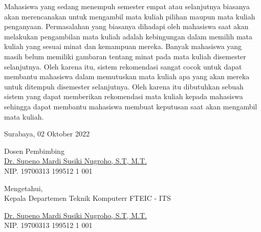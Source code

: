 Mahasiswa yang sedang menempuh semester empat atau selanjutnya biasanya akan merencanakan
untuk mengambil mata kuliah pilihan maupun mata kuliah penganyaan. Permasalahan yang biasanya dihadapi oleh mahasiswa
saat akan melakukan pengambilan mata kuliah adalah kebingungan dalam memilih mata kuliah
yang sesuai minat dan kemampuan mereka. Banyak mahasiswa yang masih belum memiliki gambaran
tentang minat pada mata kuliah disemester selanjutnya. Oleh karena itu, sistem rekomendasi
sangat cocok untuk dapat membantu mahasiswa dalam memutuskan mata kuliah apa yang akan mereka
untuk ditempuh disemester selanjutnya. Oleh karena itu dibutuhkan sebuah sistem yang dapat memberikan
rekomendasi mata kuliah kepada mahasiswa sehingga dapat membantu mahasiswa membuat keputusan saat akan
mengambil mata kuliah.
\vspace{1ex}

\begin{flushright}
  Surabaya, 02 Oktober 2022
\end{flushright}
\vspace{1ex}

\begin{center}







  Dosen Pembimbing \\
  \vspace{12ex}
  \underline{Dr. Supeno Mardi Susiki Nugroho, S.T, M.T.} \\
  NIP. 19700313 199512 1 001

  \vspace{6ex}

  Mengetahui, \\
  Kepala Departemen Teknik Komputerr FTEIC - ITS
  \vspace{12ex}

  \underline{Dr. Supeno Mardi Susiki Nugroho, S.T, M.T.} \\
  NIP. 19700313 199512 1 001

\end{center}
